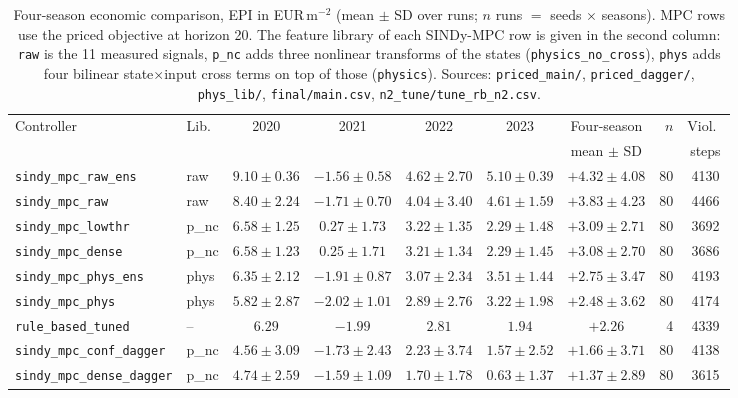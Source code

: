 \begin{table}[t]
\centering
\caption{Four-season economic comparison, EPI in EUR\,m$^{-2}$ (mean $\pm$ SD over runs;
$n$ runs $=$ seeds $\times$ seasons). MPC rows use the priced objective at horizon 20.
The feature library of each SINDy-MPC row is given in the second column: \texttt{raw} is
the 11 measured signals, \texttt{p\_nc} adds three nonlinear transforms of the states
(\texttt{physics\_no\_cross}), \texttt{phys} adds four bilinear state$\times$input cross
terms on top of those (\texttt{physics}).
Sources: \texttt{priced\_main/}, \texttt{priced\_dagger/}, \texttt{phys\_lib/},
\texttt{final/main.csv}, \texttt{n2\_tune/tune\_rb\_n2.csv}.}
\label{tab:main}
\scriptsize
\setlength{\tabcolsep}{4pt}
\begin{tabular}{@{}llcccccrc@{}}
\toprule
Controller & Lib. & 2020 & 2021 & 2022 & 2023 & Four-season & $n$ & Viol.\ \\
           &      &      &      &      &      & mean $\pm$ SD &     & steps \\
\midrule
\texttt{sindy\_mpc\_raw\_ens}    & raw  & $9.10\pm0.36$ & $-1.56\pm0.58$ & $4.62\pm2.70$ & $5.10\pm0.39$ & $\mathbf{+4.32\pm4.08}$ & 80 & 4130 \\
\texttt{sindy\_mpc\_raw}         & raw  & $8.40\pm2.24$ & $-1.71\pm0.70$ & $4.04\pm3.40$ & $4.61\pm1.59$ & $+3.83\pm4.23$ & 80 & 4466 \\
\texttt{sindy\_mpc\_lowthr}      & p\_nc & $6.58\pm1.25$ & $0.27\pm1.73$  & $3.22\pm1.35$ & $2.29\pm1.48$ & $+3.09\pm2.71$ & 80 & 3692 \\
\texttt{sindy\_mpc\_dense}       & p\_nc & $6.58\pm1.23$ & $0.25\pm1.71$  & $3.21\pm1.34$ & $2.29\pm1.45$ & $+3.08\pm2.70$ & 80 & 3686 \\
\texttt{sindy\_mpc\_phys\_ens}   & phys & $6.35\pm2.12$ & $-1.91\pm0.87$ & $3.07\pm2.34$ & $3.51\pm1.44$ & $+2.75\pm3.47$ & 80 & 4193 \\
\texttt{sindy\_mpc\_phys}        & phys & $5.82\pm2.87$ & $-2.02\pm1.01$ & $2.89\pm2.76$ & $3.22\pm1.98$ & $+2.48\pm3.62$ & 80 & 4174 \\
\texttt{rule\_based\_tuned}      & -- & $6.29$        & $-1.99$        & $2.81$        & $1.94$        & $+2.26$        & 4  & 4339 \\
\texttt{sindy\_mpc\_conf\_dagger}& p\_nc & $4.56\pm3.09$ & $-1.73\pm2.43$ & $2.23\pm3.74$ & $1.57\pm2.52$ & $+1.66\pm3.71$ & 80 & 4138 \\
\texttt{sindy\_mpc\_dense\_dagger}& p\_nc &$4.74\pm2.59$ & $-1.59\pm1.09$ & $1.70\pm1.78$ & $0.63\pm1.37$ & $+1.37\pm2.89$ & 80 & 3615 \\

\end{tabular}
\end{table}
